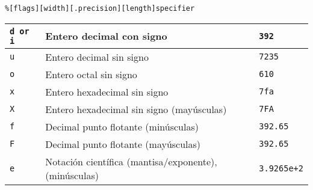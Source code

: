 \texttt{\%{[}flags{]}{[}width{]}{[}.precision{]}{[}length{]}specifier}

\vspace*{-\baselineskip}

\begin{center}

\vspace{0.2cm}

\tabletail{\hline}
\tablelasttail{\hline}
\footnotesize
{
\begin{xtabular}{|C{.15\columnwidth}|L{.65\columnwidth}|C{.20\columnwidth}|}
\texttt{d or i} & Entero decimal con signo                                                                                              & \texttt{392}          \\ \hline
\texttt{u}      & Entero decimal sin signo                                                                                              & \texttt{7235}         \\ \hline
\texttt{o}      & Entero octal sin signo                                                                                                & \texttt{610}          \\ \hline
\texttt{x}      & Entero hexadecimal sin signo                                                                                          & \texttt{7fa}          \\ \hline
\texttt{X}      & Entero hexadecimal sin signo (may\'usculas)                                                                           & \texttt{7FA}          \\ \hline
\texttt{f}      & Decimal punto flotante (min\'usculas)                                                                                 & \texttt{392.65}       \\ \hline
\texttt{F}      & Decimal punto flotante (may\'usculas)                                                                                 & \texttt{392.65}       \\ \hline
\texttt{e}      & Notaci\'on cient\'ifica (mantisa/exponente), (min\'usculas)                                                           & \texttt{3.9265e+2}    \\ \hline

\end{xtabular}}
\end{center}
